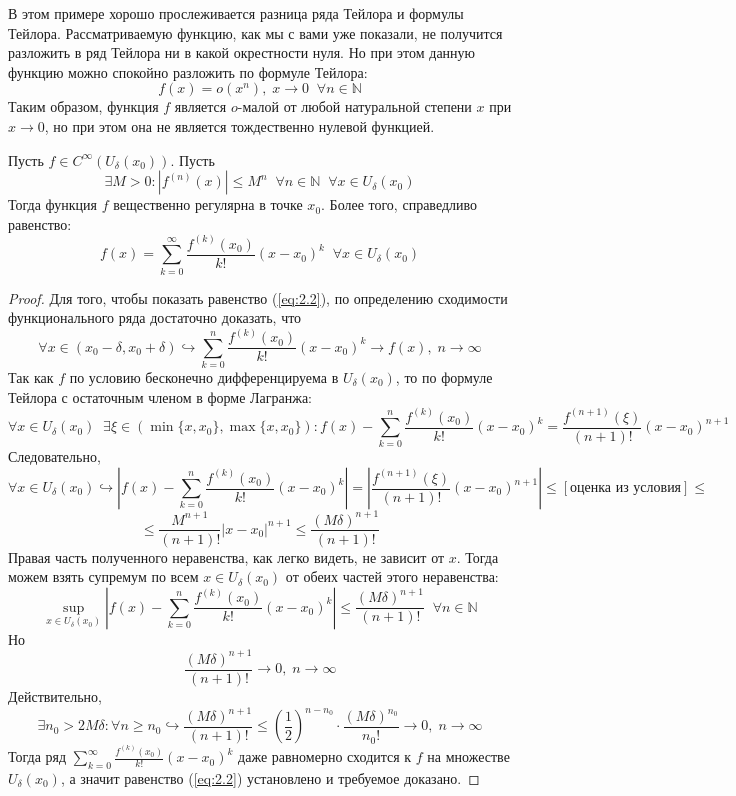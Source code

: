 \documentclass[11pt]{article}
\begin{document}
\begin{remark}
    В этом примере хорошо прослеживается разница ряда Тейлора и формулы Тейлора. Рассматриваемую функцию, как мы с вами уже показали, не получится разложить в ряд Тейлора ни в какой окрестности нуля. Но при этом данную функцию можно спокойно разложить по формуле Тейлора:
    \[f(x) = o \left(x^n\right), \; x \to 0 \; \; \forall n \in \mathbb{N}\]
    Таким образом, функция $f$ является $o$-малой от любой натуральной степени $x$ при $x \to 0$, но при этом она не является тождественно нулевой функцией.
\end{remark}

\begin{theorem}
    Пусть $f \in C^{\infty} (U_{\delta}(x_0))$. Пусть 
    \[\exists M > 0: \left\lvert f^{(n)} (x) \right\rvert \leq M^n \; \; \forall n \in \mathbb{N} \; \; \forall x \in U_{\delta} (x_0)\]
    Тогда функция $f$ вещественно регулярна в точке $x_0$. Более того, справедливо равенство:
    \begin{equation} \label{eq:2.2}
        f(x) = \sum_{k = 0}^{\infty} \frac{f^{(k)} (x_0)}{k!} (x - x_0)^k \; \; \forall x \in U_{\delta} (x_0)
    \end{equation}
\end{theorem}

\begin{proof}
    Для того, чтобы показать равенство (\ref{eq:2.2}), по определению сходимости функционального ряда достаточно доказать, что 
    \[\forall x \in (x_0 - \delta, x_0 + \delta) \hookrightarrow \sum_{k = 0}^n \frac{f^{(k)} (x_0)}{k!} (x - x_0)^k \to f(x), \; n \to \infty\]
    Так как $f$ по условию бесконечно дифференцируема в $U_{\delta}(x_0)$, то по формуле Тейлора с остаточным членом в форме Лагранжа:
    \[\forall x \in U_{\delta} (x_0) \; \; \exists \xi \in (\min\{x, x_0\}, \max\{x, x_0\}): f(x) - \sum_{k = 0}^n \frac{f^{(k)} (x_0)}{k!} (x - x_0)^k = \frac{f^{(n + 1)} (\xi)}{(n + 1)!} (x - x_0)^{n + 1}\]
    Следовательно,
    \[\forall x \in U_{\delta} (x_0) \hookrightarrow \left\lvert f(x) - \sum_{k = 0}^n \frac{f^{(k)} (x_0)}{k!} (x - x_0)^k \right\rvert = \left\lvert \frac{f^{(n + 1)} (\xi)}{(n + 1)!} (x - x_0)^{n + 1} \right\rvert \leq [\text{оценка из условия}] \leq\]
    \[\leq \frac{M^{n + 1}}{(n + 1)!} \left\lvert x - x_0 \right\rvert^{n + 1} \leq \frac{(M\delta)^{n + 1}}{(n + 1)!} \]
    Правая часть полученного неравенства, как легко видеть, не зависит от $x$. Тогда можем взять супремум по всем $x \in U_{\delta} (x_0)$ от обеих частей этого неравенства:
    \[\sup_{x \in U_{\delta} (x_0)} \left\lvert f(x) - \sum_{k = 0}^n \frac{f^{(k)} (x_0)}{k!} (x - x_0)^k \right\rvert \leq \frac{(M\delta)^{n + 1}}{(n + 1)!} \; \; \forall n \in \mathbb{N}\]
    Но 
    \[\frac{(M\delta)^{n + 1}}{(n + 1)!} \to 0, \; n \to \infty\]
    Действительно,
    \[\exists n_0 > 2M\delta: \forall n \geq n_0 \hookrightarrow \frac{(M\delta)^{n + 1}}{(n + 1)!} \leq \left(\frac{1}{2}\right)^{n - n_0} \cdot \frac{(M\delta)^{n_0}}{n_0 !} \to 0, \; n \to \infty\]
    Тогда ряд $\displaystyle \sum_{k = 0}^{\infty} \frac{f^{(k)} (x_0)}{k!} (x - x_0)^k$ даже равномерно сходится к $f$ на множестве $U_{\delta}(x_0)$, а значит равенство (\ref{eq:2.2}) установлено и требуемое доказано.
\end{proof}
\end{document}
